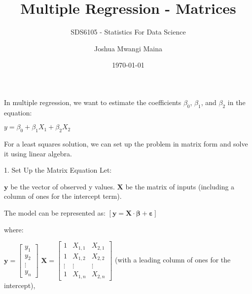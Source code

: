 \documentclass[11pt]{beamer}
\author{Joshua Mwangi Maina}
\title{Multiple Regression - Matrices}
\subtitle{SDS6105 - Statistics For Data Science}
\date{\today}
\institute{UoN, Science and Technology}
\begin{document}

\begin{frame}
\titlepage
\end{frame}


\begin{frame}

In multiple regression, we want to estimate the coefficients $\beta_0$, $\beta_1$, and $\beta_2$ in the equation:
\linebreak 

$y = \beta_0 + \beta_1 X_1 + \beta_2 X_2$
\linebreak 

For a least squares solution, we can set up the problem in matrix form and solve it using linear algebra.

1. Set Up the Matrix Equation
\linebreak 
Let:

\hspace*{15pt}$	\mathbf{y}$ be the vector of observed y values.
	\linebreak 
\hspace*{15pt}$\mathbf{X}$ be the matrix of inputs (including a column of ones for the intercept term).

\end{frame}

\begin{frame}

The model can be represented as:
\linebreak 
\linebreak 
$[\mathbf{y} = \mathbf{X} \cdot \boldsymbol{\beta} + \mathbf{\varepsilon}]$

where:

\hspace*{15pt}$\mathbf{y} = \begin{bmatrix} y_1 \\ y_2 \\ \vdots \\ y_n \end{bmatrix}$
\medskip 
\linebreak 
\hspace*{15pt}$\mathbf{X} = \begin{bmatrix} 1 & X_{1,1} & X_{2,1} \\ 1 & X_{1,2} & X_{2,2} \\ \vdots & \vdots & \vdots \\ 1 & X_{1,n} & X_{2,n} \end{bmatrix}$ (with a leading column of ones for the intercept),	
	
\end{frame}
\end{document}
